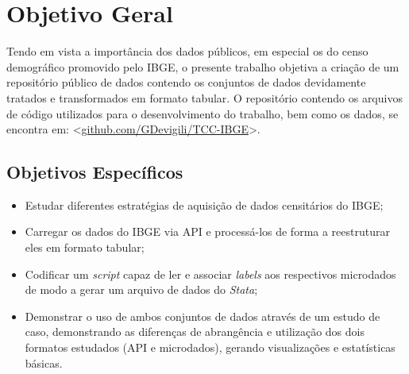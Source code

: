 


\chapter{Objetivo Geral}

    Tendo em vista a importância dos dados públicos, em especial os do censo demográfico promovido pelo IBGE, o presente trabalho objetiva a criação de um repositório público de dados contendo os conjuntos de dados devidamente tratados e transformados em formato tabular. O repositório contendo os arquivos de código utilizados para o desenvolvimento do trabalho, bem como os dados, se encontra em: <\url{github.com/GDevigili/TCC-IBGE}>.


\section{Objetivos Específicos}

\begin{itemize}
    \item Estudar diferentes estratégias de aquisição de dados censitários do IBGE;
    \item Carregar os dados do IBGE via API e processá-los de forma a reestruturar eles em formato tabular;
    \item Codificar um \textit{script} capaz de ler e associar \textit{labels} aos respectivos microdados de modo a gerar um arquivo de dados do \textit{Stata};
    \item Demonstrar o uso de ambos conjuntos de dados através de um estudo de caso, demonstrando as diferenças de abrangência e utilização dos dois formatos estudados (API e microdados), gerando visualizações e estatísticas básicas.
\end{itemize}